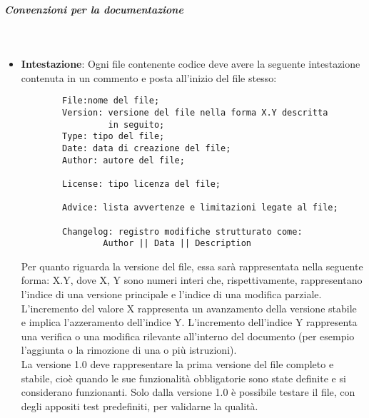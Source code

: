     \subparagraph{Convenzioni per la documentazione}
    ~\\
        \begin{itemize}
            \item \textbf{Intestazione}: Ogni file contenente codice deve avere la seguente
            intestazione contenuta in un commento e posta all’inizio del file stesso:
                \begin{verbatim}
        File:nome del file;
        Version: versione del file nella forma X.Y descritta
                 in seguito; 
        Type: tipo del file; 
        Date: data di creazione del file;
        Author: autore del file; 
                    
        License: tipo licenza del file;
                    
        Advice: lista avvertenze e limitazioni legate al file;
                    
        Changelog: registro modifiche strutturato come:
                Author || Data || Description 
                \end{verbatim}
            Per quanto riguarda la versione del file, essa sarà rappresentata nella seguente forma: X.Y, dove X, Y sono numeri interi che, rispettivamente, rappresentano l'indice di una versione principale e l'indice di una modifica parziale. L'incremento del valore X rappresenta un avanzamento della versione stabile e implica l'azzeramento dell'indice Y. L'incremento dell'indice Y rappresenta una verifica o una modifica rilevante all'interno del documento (per esempio l'aggiunta o la rimozione di una o più istruzioni).\\
            La  versione 1.0 deve  rappresentare  la  prima  versione  del  file  completo  e stabile, cioè quando le sue funzionalità obbligatorie sono state definite e si considerano funzionanti. Solo dalla versione 1.0 è possibile testare il file, con degli appositi test predefiniti, per validarne la qualità.
           
        \end{itemize}
    

